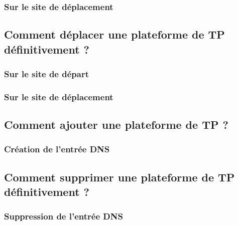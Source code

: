 \documentclass[a4paper]{article}
\begin{document}
\subsubsection{Sur le site de déplacement}

\subsection{Comment déplacer une plateforme de TP définitivement ?}

\subsubsection{Sur le site de départ}

\subsubsection{Sur le site de déplacement}

\subsection{Comment ajouter une plateforme de TP  ?}

\subsubsection{Création de l'entrée DNS}

\subsection{Comment supprimer une plateforme de TP définitivement ?}

\subsubsection{Suppression de l'entrée DNS}
\end{document}
